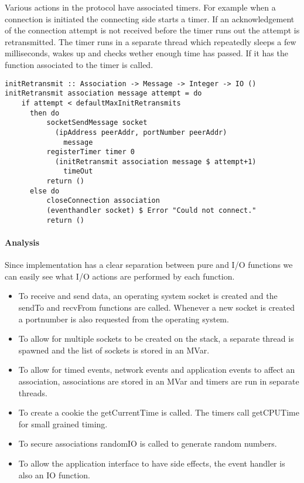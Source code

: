 Various actions in the protocol have associated timers. For example when a connection is initiated the connecting side starts a timer. If an acknowledgement of the connection attempt is not received before the timer runs out the attempt is retransmitted. The timer runs in a separate thread which repeatedly sleeps a few milliseconds, wakes up and checks wether enough time has passed. If it has the function associated to the timer is called.

\begin{lstlisting}[caption={The init retransmission function}]
initRetransmit :: Association -> Message -> Integer -> IO ()
initRetransmit association message attempt = do
    if attempt < defaultMaxInitRetransmits
      then do
          socketSendMessage socket 
            (ipAddress peerAddr, portNumber peerAddr)
              message
          registerTimer timer 0
            (initRetransmit association message $ attempt+1)
              timeOut
          return ()
      else do
          closeConnection association
          (eventhandler socket) $ Error "Could not connect."
          return ()
\end{lstlisting}

\paragraph{Analysis}
Since implementation has a clear separation between pure and I/O functions we can easily see what I/O actions are performed by each function. 

\begin{itemize}
\item To receive and send data, an operating system socket is created and the sendTo and recvFrom functions are called. Whenever a new socket is created a portnumber is also requested from the operating system.
\item To allow for multiple sockets to be created on the stack, a separate thread is spawned and the list of sockets is stored in an MVar.
\item To allow for timed events, network events and application events to affect an association, associations are stored in an MVar and timers are run in separate threads.
\item To create a cookie the getCurrentTime is called. The timers call getCPUTime for small grained timing.
\item To secure associations randomIO is called to generate random numbers.
\item To allow the application interface to have side effects, the event handler is also an IO function.
\end{itemize}

